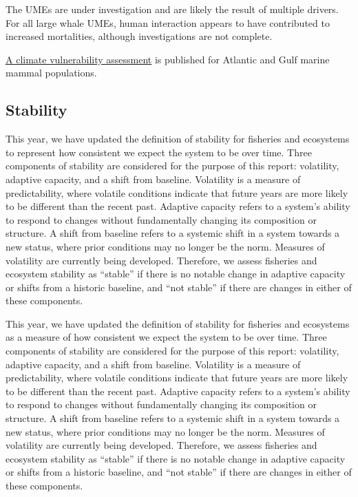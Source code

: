 \documentclass[
  10pt,
]{article}
\begin{document}
The UMEs are under investigation and are likely the result of multiple drivers. For all large whale UMEs, human interaction appears to have contributed to increased mortalities, although investigations are not complete.

\href{https://journals.plos.org/plosone/article?id=10.1371/journal.pone.0290643}{A climate vulnerability assessment} is published for Atlantic and Gulf marine mammal populations.

\subsection{Stability}\label{stability}

This year, we have updated the definition of stability for fisheries and ecosystems to represent how consistent we expect the system to be over time. Three components of stability are considered for the purpose of this report: volatility, adaptive capacity, and a shift from baseline. Volatility is a measure of predictability, where volatile conditions indicate that future years are more likely to be different than the recent past. Adaptive capacity refers to a system's ability to respond to changes without fundamentally changing its composition or structure. A shift from baseline refers to a systemic shift in a system towards a new status, where prior conditions may no longer be the norm. Measures of volatility are currently being developed. Therefore, we assess fisheries and ecosystem stability as ``stable'' if there is no notable change in adaptive capacity or shifts from a historic baseline, and ``not stable'' if there are changes in either of these components.

This year, we have updated the definition of stability for fisheries and ecosystems as a measure of how consistent we expect the system to be over time. Three components of stability are considered for the purpose of this report: volatility, adaptive capacity, and a shift from baseline. Volatility is a measure of predictability, where volatile conditions indicate that future years are more likely to be different than the recent past. Adaptive capacity refers to a system's ability to respond to changes without fundamentally changing its composition or structure. A shift from baseline refers to a systemic shift in a system towards a new status, where prior conditions may no longer be the norm. Measures of volatility are currently being developed. Therefore, we assess fisheries and ecosystem stability as ``stable'' if there is no notable change in adaptive capacity or shifts from a historic baseline, and ``not stable'' if there are changes in either of these components.
\end{document}
